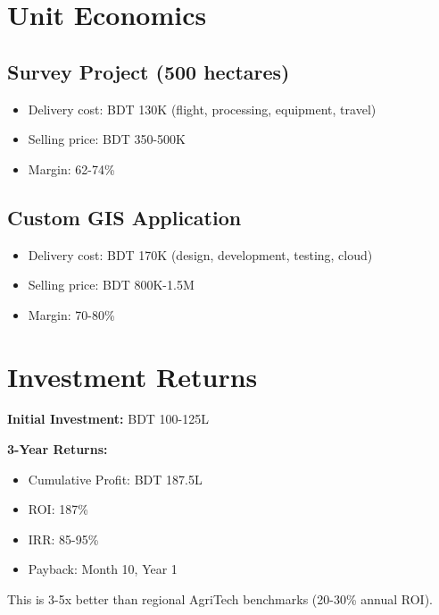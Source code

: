 \section{Unit Economics}

\subsection{Survey Project (500 hectares)}
\begin{itemize}
    \item Delivery cost: BDT 130K (flight, processing, equipment, travel)
    \item Selling price: BDT 350-500K
    \item Margin: 62-74\%
\end{itemize}

\subsection{Custom GIS Application}
\begin{itemize}
    \item Delivery cost: BDT 170K (design, development, testing, cloud)
    \item Selling price: BDT 800K-1.5M
    \item Margin: 70-80\%
\end{itemize}

\section{Investment Returns}

\textbf{Initial Investment:} BDT 100-125L

\textbf{3-Year Returns:}
\begin{itemize}
    \item Cumulative Profit: BDT 187.5L
    \item ROI: 187\%
    \item IRR: 85-95\%
    \item Payback: Month 10, Year 1
\end{itemize}

This is 3-5x better than regional AgriTech benchmarks (20-30\% annual ROI).


